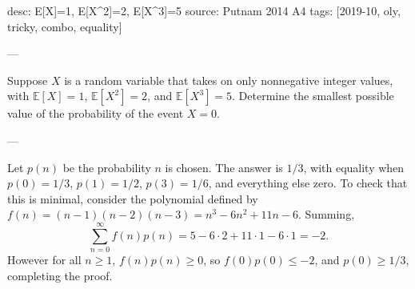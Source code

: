 desc: E[X]=1, E[X^2]=2, E[X^3]=5
source: Putnam 2014 A4
tags: [2019-10, oly, tricky, combo, equality]

---

Suppose $X$ is a random variable that takes on only nonnegative integer values, with $\mathbb E[X]=1$, $\mathbb E[X^2]=2$, and $\mathbb E[X^3]=5$. Determine the smallest possible value of the probability of the event $X=0$.

---

Let $p(n)$ be the probability $n$ is chosen. The answer is $1/3$, with equality when $p(0)=1/3$, $p(1)=1/2$, $p(3)=1/6$, and everything else zero. To check that this is minimal, consider the polynomial defined by $f(n)=(n-1)(n-2)(n-3)=n^3-6n^2+11n-6$. Summing, \[\sum_{n=0}^\infty f(n)p(n)=5-6\cdot2+11\cdot1-6\cdot1=-2.\]
However for all $n\ge1$, $f(n)p(n)\ge0$, so $f(0)p(0)\le-2$, and $p(0)\ge1/3$, completing the proof.
